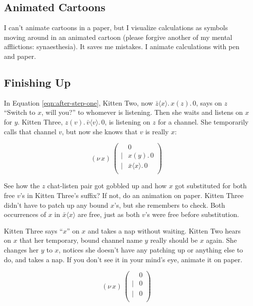 \documentclass[10pt,oneside,x11names]{article}
\newcommand\napping    [0]{0}
\newcommand\chatting   [3]{\bar{#1}\langle{#2}\rangle{}.\,#3}
\newcommand\listening  [3]{#1(#2).\,#3}
\newcommand\whispering [2]{(\nu\,#1)\,{#2}}
\newcommand{\kitThree}{\listening{z}{v}{\chatting{v}{v}{\napping}}}
\theoremstyle{definition}
\theoremstyle{warning}
\begin{document}
\subsection{Animated Cartoons}
\label{sec:org24fbc9f}

I can't animate cartoons in a paper, but I visualize
calculations as symbols moving around in an animated cartoon
(please forgive another of my mental afflictions:
synaesthesia). It saves me mistakes. I animate calculations
with pen and paper.

\subsection{Finishing Up}
\label{sec:orgdaa1f8c}

In Equation \ref{eqn:after-step-one}, Kitten Two, now
\(\chatting{z}{x}{\listening{x}{z}{\napping}}\), says on \(z\)
``Switch to \(x\), will you?'' to whomever is listening. Then she
waits and listens on \(x\) for \(y\). Kitten Three, \(\kitThree\), is
listening on \(z\) for a channel. She temporarily calls that
channel \(v\), but now she knows that \(v\) is really \(x\):

\begin{equation}
\whispering{x}{\left(
\begin{array}{clll}
 {}     & \napping  \\
 \vert  & {\listening{x}{y}{\napping}} \\
 \vert  & {\chatting{x}{x}{\napping}} \\
\end{array}\right)}
\end{equation}

See how the \(z\) chat-listen pair got gobbled up and how \(x\)
got substituted for both free \(v\)'s in Kitten Three's suffix?
If not, do an animation on paper. Kitten Three didn't have to
patch up any bound \(x\)'s, but she remembers to check. Both
occurrences of \(x\) in \(\bar{x}\langle{x}\rangle\) are free,
just as both \(v\)'s were free before substitution.

Kitten Three says ``\(x\)'' on \(x\) and takes a nap without
waiting. Kitten Two hears on \(x\) that her temporary, bound
channel name \(y\) really should be \(x\) again. She changes her
\(y\) to \(x\), notices she doesn't have any patching up or
anything else to do, and takes a nap. If you don't see it in
your mind's eye, animate it on paper.

\begin{equation}
\whispering{x}{\left(
\begin{array}{clll}
 {}     & \napping   \\
 \vert  & {\napping} \\
 \vert  & {\napping} \\
\end{array}\right)}
\end{equation}
\end{document}
